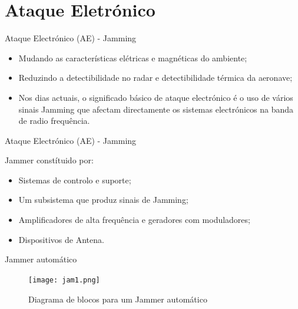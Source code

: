 \documentclass[portuguese,10pt]{beamer}
\begin{document}


\section{Ataque Eletrónico}

\begin{frame}{Ataque Electrónico (AE) - Jamming }
    \begin{itemize}
        \item Mudando as características elétricas e magnéticas do ambiente;
        \vspace*{3mm}
        \item  Reduzindo a detectibilidade no radar e detectibilidade térmica da aeronave; 
        \vspace*{3mm}
        \item Nos dias actuais, o significado básico de ataque electrónico é o uso de vários sinais Jamming que afectam directamente os sistemas electrónicos na banda de radio frequência.
    
    \end{itemize}
    
   
\end{frame}

\begin{frame}{Ataque Electrónico (AE) - Jamming}
    
    Jammer constítuido por: 
     \vspace*{5mm}
    \begin{itemize}
        \item Sistemas de controlo e suporte;
        \vspace*{3mm}
        \item  Um subsistema que produz sinais de Jamming; 
        \vspace*{3mm}
        \item Amplificadores de alta frequência e geradores com moduladores;
         \vspace*{3mm}
         \item Dispositivos de Antena.
    
    \end{itemize}
    
   
\end{frame}


\begin{frame}{Jammer automático}
    
\begin{figure}[ht]
\centering
\texttt{[image: jam1.png]}
\caption{Diagrama de blocos para um Jammer automático}
\label{jam1}
\end{figure} 
\end{frame}
\end{document}
